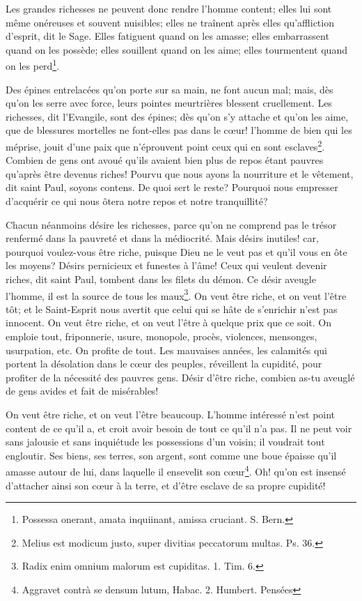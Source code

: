 \documentclass[instructions.tex]{subfiles}
\begin{document}
\secundo Les grandes richesses ne peuvent donc rendre l’homme content; elles lui sont même onéreuses et souvent nuisibles; elles ne traînent après elles qu’affliction d’esprit, dit le Sage. Elles fatiguent quand on les amasse; elles embarrassent quand on les possède; elles souillent quand on les aime; elles tourmentent quand on les perd\footnote{Possessa onerant, amata inquiinant, amissa cruciant. S. Bern.}.
 
Des épines entrelacées qu’on porte sur sa main, ne font aucun mal; mais, dès qu’on les serre avec force, leurs pointes meurtrières blessent cruellement. Les richesses, dit l’Evangile, sont des épines; dès qu’on s’y attache et qu’on les aime, que de blessures mortelles ne font-elles pas dans le cœur! l’homme de bien qui les méprise, jouit d’une paix que n’éprouvent point ceux qui en sont esclaves\footnote{ Melius est modicum justo, super divitias peccatorum multas. Ps. 36.}. Combien de gens ont avoué qu’ils avaient bien plus de repos étant pauvres qu’après être devenus riches! Pourvu que nous ayons la nourriture et le vêtement, dit saint Paul, soyons contens. De quoi sert le reste? Pourquoi nous empresser d’acquérir ce qui nous ôtera notre repos et notre tranquillité?
 
\tertio Chacun néanmoins désire les richesses, parce qu’on ne comprend pas le trésor renfermé dans la pauvreté et dans la médiocrité. Mais désirs inutiles! car, pourquoi voulez-vous être riche, puisque Dieu ne le veut pas et qu’il vous en ôte les moyens? Désirs pernicieux et funestes à l’âme! Ceux qui veulent devenir riches, dit saint Paul, tombent dans les filets du démon. Ce désir aveugle l’homme, il est la source de tous les maux\footnote{Radix enim omnium malorum est cupiditas. 1. Tim. 6.}. On veut être riche, et on veut l’être tôt; et le Saint-Esprit nous avertit que celui qui se hâte de s’enrichir n’est pas innocent. On veut être riche, et on veut l’être à quelque prix que ce soit. On emploie tout, friponnerie, usure, monopole, procès, violences, mensonges, usurpation, etc. On profite de tout. Les mauvaises années, les calamités qui portent la désolation dans le cœur des peuples, réveillent la cupidité, pour profiter de la nécessité des pauvres gens. Désir d’être riche, combien as-tu aveuglé de gens avides et fait de misérables!
 
On veut être riche, et on veut l’être beaucoup. L’homme intéressé n’est point content de ce qu’il a, et croit avoir besoin de tout ce qu’il n’a pas. Il ne peut voir sans jalousie et sans inquiétude les possessions d’un voisin; il voudrait tout engloutir. Ses biens, ses terres, son argent, sont comme une boue épaisse qu’il amasse autour de lui, dans laquelle il ensevelit son cœur\footnote{Aggravet contrà se densum lutum, Habac. 2. Humbert. Pensées}. Oh! qu’on est insensé d’attacher ainsi son cœur à la terre, et d’être esclave de sa propre cupidité!
 
\end{document}
